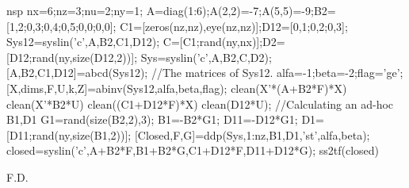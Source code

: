 \begin{examples}
  \begin{mintednsp}{nsp}
    nx=6;nz=3;nu=2;ny=1;
    A=diag(1:6);A(2,2)=-7;A(5,5)=-9;B2=[1,2;0,3;0,4;0,5;0,0;0,0];
    C1=[zeros(nz,nz),eye(nz,nz)];D12=[0,1;0,2;0,3];
    Sys12=syslin('c',A,B2,C1,D12);
    C=[C1;rand(ny,nx)];D2=[D12;rand(ny,size(D12,2))];
    Sys=syslin('c',A,B2,C,D2);
    [A,B2,C1,D12]=abcd(Sys12);  //The matrices of Sys12.
    alfa=-1;beta=-2;flag='ge';
    [X,dims,F,U,k,Z]=abinv(Sys12,alfa,beta,flag);
    clean(X'*(A+B2*F)*X)
    clean(X'*B2*U)
    clean((C1+D12*F)*X)
    clean(D12*U);
    //Calculating an ad-hoc B1,D1
    G1=rand(size(B2,2),3);
    B1=-B2*G1;
    D11=-D12*G1;
    D1=[D11;rand(ny,size(B1,2))];
    [Closed,F,G]=ddp(Sys,1:nz,B1,D1,'st',alfa,beta);
    closed=syslin('c',A+B2*F,B1+B2*G,C1+D12*F,D11+D12*G);
    ss2tf(closed)
  \end{mintednsp}
\end{examples}
\begin{manseealso}
     
\end{manseealso}
\begin{authors}
  F.D.  
\end{authors}
